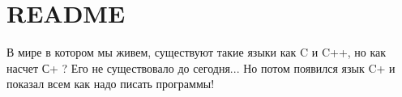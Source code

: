 \chapter{README }
\hypertarget{md__r_e_a_d_m_e}{}\label{md__r_e_a_d_m_e}
В мире в котором мы живем, существуют такие языки как C и C++, но как насчет С+ ? Его не существовало до сегодня... Но потом появился язык C+ и показал всем как надо писать программы! 